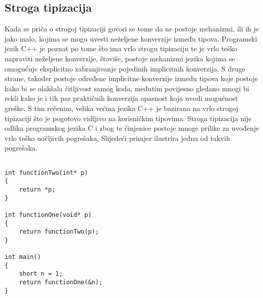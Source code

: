 \subsection{Stroga tipizacija}
Kada se priča o strogoj tipizaciji govori se tome da ne postoje mehanizmi, ili ih je jako malo, kojima se mogu uvesti neželjene konverzije između tipova. Programski jezik C++ je poznat po tome što ima vrlo strogu tipizaciju te je vrlo teško napraviti neželjene konverzije, štoviše, postoje mehanizmi jezika kojima se omogućuje eksplicitno zabranjivanje pojedinih implicitnih konverzija. S druge strane, također postoje određene implicitne konverzije između tipova koje postoje kako bi se olakšala čitljivost samog koda, međutim povijesno gledano mnogi bi rekli kako je i tih par praktičnih konverzija opasnost koja uvodi mogućnost greške. S tim rečenim, velika većina jezika C++ je bazirana na vrlo strogoj tipizaciji što je pogotovo vidljivo na korisničkim tipovima. Stroga tipizacija nije odlika programskog jezika C i zbog te činjenice postoje mnoge prilike za uvođenje vrlo teško uočljivih pogrešaka. Slijedeći primjer ilustrira jednu od takvih pogrešaka.
\lstset{language=C, tabsize=2, frame=single, breaklines=true}
\begin{lstlisting}

int functionTwo(int* p)
{
    return *p;
}

int functionOne(void* p)
{
    return functionTwo(p);
}

int main()
{
    short n = 1;
    return functionOne(&n);
}
\end{lstlisting}
